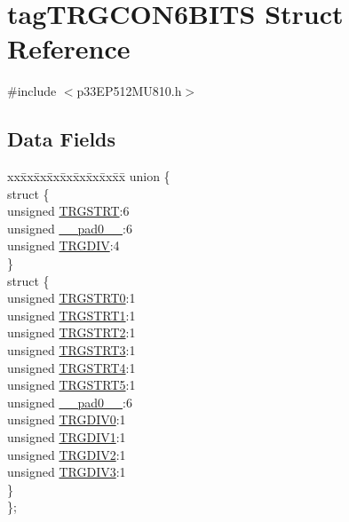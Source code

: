 \hypertarget{structtag_t_r_g_c_o_n6_b_i_t_s}{}\section{tag\+T\+R\+G\+C\+O\+N6\+B\+I\+TS Struct Reference}
\label{structtag_t_r_g_c_o_n6_b_i_t_s}


{\ttfamily \#include $<$p33\+E\+P512\+M\+U810.\+h$>$}

\subsection*{Data Fields}
\begin{DoxyCompactItemize}
\item 
\begin{tabbing}
xx\=xx\=xx\=xx\=xx\=xx\=xx\=xx\=xx\=\kill
union \{\\
\>struct \{\\
\>\>unsigned \hyperlink{structtag_t_r_g_c_o_n6_b_i_t_s_a53d84dcc3e23b3d2db356ea32c245b6f}{TRGSTRT}:6\\
\>\>unsigned \hyperlink{structtag_t_r_g_c_o_n6_b_i_t_s_adf71f3d8410c1f1dbbc96680a92c49af}{\_\_pad0\_\_}:6\\
\>\>unsigned \hyperlink{structtag_t_r_g_c_o_n6_b_i_t_s_a10310cfb772e07d5f62911d0619c3ae0}{TRGDIV}:4\\
\>\} \\
\>struct \{\\
\>\>unsigned \hyperlink{structtag_t_r_g_c_o_n6_b_i_t_s_a75147b4831d3afa487fe9999d2a58c67}{TRGSTRT0}:1\\
\>\>unsigned \hyperlink{structtag_t_r_g_c_o_n6_b_i_t_s_ac76b84548f8cfa382a2d703890b58dad}{TRGSTRT1}:1\\
\>\>unsigned \hyperlink{structtag_t_r_g_c_o_n6_b_i_t_s_a66e40dba969f7a5eafe81b8f341dd665}{TRGSTRT2}:1\\
\>\>unsigned \hyperlink{structtag_t_r_g_c_o_n6_b_i_t_s_a20e528d9be27fc91e2d28bb69f809c0a}{TRGSTRT3}:1\\
\>\>unsigned \hyperlink{structtag_t_r_g_c_o_n6_b_i_t_s_a9e26684d05dfb877c150795a627387cc}{TRGSTRT4}:1\\
\>\>unsigned \hyperlink{structtag_t_r_g_c_o_n6_b_i_t_s_aabeb06bb6258310e01e1a0cd96bf30ca}{TRGSTRT5}:1\\
\>\>unsigned \hyperlink{structtag_t_r_g_c_o_n6_b_i_t_s_adf71f3d8410c1f1dbbc96680a92c49af}{\_\_pad0\_\_}:6\\
\>\>unsigned \hyperlink{structtag_t_r_g_c_o_n6_b_i_t_s_a6d425374bc65bb89be540344ef5393e5}{TRGDIV0}:1\\
\>\>unsigned \hyperlink{structtag_t_r_g_c_o_n6_b_i_t_s_a92a66ed2923cfb0f855e3d9fe36654f9}{TRGDIV1}:1\\
\>\>unsigned \hyperlink{structtag_t_r_g_c_o_n6_b_i_t_s_a8a4ec980bd7f8bdb174f00a7888cdfce}{TRGDIV2}:1\\
\>\>unsigned \hyperlink{structtag_t_r_g_c_o_n6_b_i_t_s_a0b99e8f3f8539f9bf133127a32824612}{TRGDIV3}:1\\
\>\} \\
\}; \\


\end{tabbing}
\end{DoxyCompactItemize}
